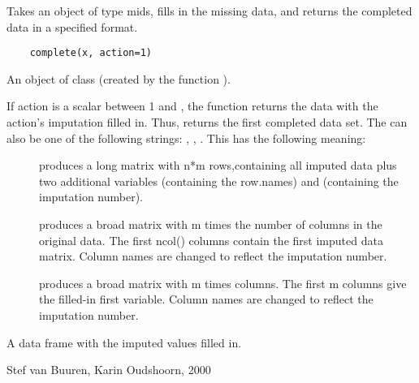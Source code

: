 \documentclass{article}
\begin{document}
\begin{Description}\relax
Takes an object of type mids, fills in the missing data, and
returns the completed data in a specified format.
\end{Description}
\begin{Usage}
\begin{verbatim}
    complete(x, action=1)
\end{verbatim}
\end{Usage}
\begin{Arguments}
\begin{ldescription}
\item[\code{x}] An object of class 
(created by the function ).
\item[\code{action}] If action is a scalar between 1 and ,
the function returns the data with the action's
imputation filled in. Thus,  returns
the first
completed data set. 
The can also be one of the following
strings: , , .
This has the following meaning:
\begin{description}
\item[] produces a long matrix with n*m
rows,containing all imputed data plus two additional
variables  (containing the row.names)
and  (containing the imputation number).
\item[] produces a broad matrix with m times
the number of columns in the original data.
The first ncol() columns contain the first
imputed data matrix. Column names are changed to
reflect the imputation number.
\item[] produces a broad matrix with m times
 columns. The first m columns
give the filled-in first variable. Column names are
changed to reflect the imputation number.
\end{description}

\end{ldescription}
\end{Arguments}
\begin{Value}
A data frame with the imputed values filled in.
\end{Value}
\begin{Author}\relax
Stef van Buuren, Karin Oudshoorn, 2000
\end{Author}
\end{document}
